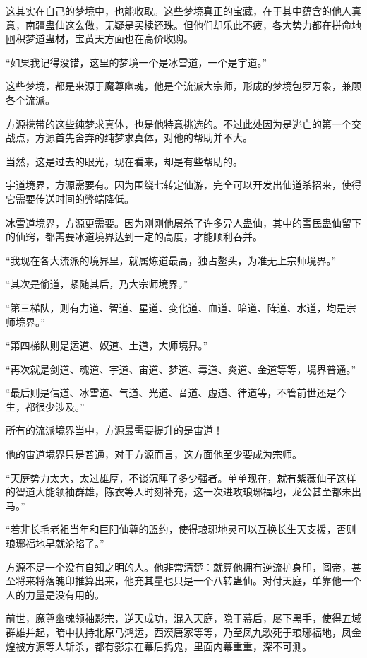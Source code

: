 \begin{this_body}
这其实在自己的梦境中，也能收取。这些梦境真正的宝藏，在于其中蕴含的他人真意，南疆蛊仙这么做，无疑是买椟还珠。但他们却乐此不疲，各大势力都在拼命地囤积梦道蛊材，宝黄天方面也在高价收购。

“如果我记得没错，这里的梦境一个是冰雪道，一个是宇道。”

这些梦境，都是来源于魔尊幽魂，他是全流派大宗师，形成的梦境包罗万象，兼顾各个流派。

方源携带的这些纯梦求真体，也是他特意挑选的。不过此处因为是逃亡的第一个交战点，方源首先舍弃的纯梦求真体，对他的帮助并不大。

当然，这是过去的眼光，现在看来，却是有些帮助的。

宇道境界，方源需要有。因为围绕七转定仙游，完全可以开发出仙道杀招来，使得它需要传送时间的弊端降低。

冰雪道境界，方源更需要。因为刚刚他屠杀了许多异人蛊仙，其中的雪民蛊仙留下的仙窍，都需要冰道境界达到一定的高度，才能顺利吞并。

“我现在各大流派的境界里，就属炼道最高，独占鳌头，为准无上宗师境界。”

“其次是偷道，紧随其后，乃大宗师境界。”

“第三梯队，则有力道、智道、星道、变化道、血道、暗道、阵道、水道，均是宗师境界。”

“第四梯队则是运道、奴道、土道，大师境界。”

“再次就是剑道、魂道、宇道、宙道、梦道、毒道、炎道、金道等等，境界普通。”

“最后则是信道、冰雪道、气道、光道、音道、虚道、律道等，不管前世还是今生，都很少涉及。”

所有的流派境界当中，方源最需要提升的是宙道！

他的宙道境界只是普通，对于方源而言，这方面他至少要成为宗师。

“天庭势力太大，太过雄厚，不谈沉睡了多少强者。单单现在，就有紫薇仙子这样的智道大能领袖群雄，陈衣等人时刻补充，这一次进攻琅琊福地，龙公甚至都未出马。”

“若非长毛老祖当年和巨阳仙尊的盟约，使得琅琊地灵可以互换长生天支援，否则琅琊福地早就沦陷了。”

方源不是一个没有自知之明的人。他非常清楚：就算他拥有逆流护身印，阎帝，甚至将来将落魄印推算出来，他充其量也只是一个八转蛊仙。对付天庭，单靠他一个人的力量是没有用的。

前世，魔尊幽魂领袖影宗，逆天成功，混入天庭，隐于幕后，屡下黑手，使得五域群雄并起，暗中扶持北原马鸿运，西漠唐家等等，乃至凤九歌死于琅琊福地，凤金煌被方源等人斩杀，都有影宗在幕后捣鬼，里面内幕重重，深不可测。


\end{this_body}
